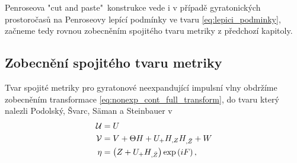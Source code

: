 Penroseova "cut and paste"\ konstrukce vede i v případě gyratonických prostoročasů na Penroseovy lepící podmínky ve tvaru \eqref{eq:lepici_podminky}, začneme tedy rovnou zobecněním
spojitého tvaru metriky z předchozí kapitoly.

\subsection{Zobecnění spojitého tvaru metriky}
Tvar spojité metriky pro gyratonové neexpandující impulsní vlny obdržíme zobecněním transformace \eqref{eq:nonexp_cont_full_transform},
do tvaru který nalezli Podolský, Švarc, Säman a Steinbauer v \cite{Podolsky_2017}
\begin{equation}
    \label{eq:gyraton_cont_transformation}
    \begin{split}
        \mathcal{U} &= U \\
        \mathcal{V} &= V + \Theta H + U_{+} H_{,Z} H_{,\bar{Z}} + W \\
        \eta &= \left(Z + U_{+} H_{,\bar{Z}}\right) \exp \left(i F \right),
    \end{split}
\end{equation}

